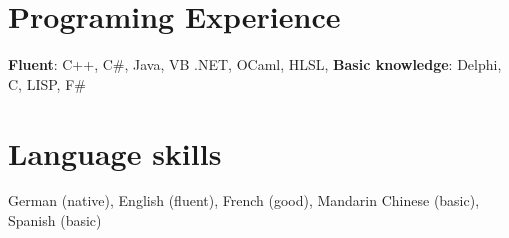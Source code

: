 \section{\sc Programing Experience}

\textbf{Fluent}: C++, C\#, Java, VB .NET, OCaml, HLSL, 
\textbf{Basic knowledge}: Delphi, C, LISP, F\# \\

\section{\sc Language skills}

German (native), English (fluent), French (good), Mandarin Chinese (basic),
Spanish (basic)
